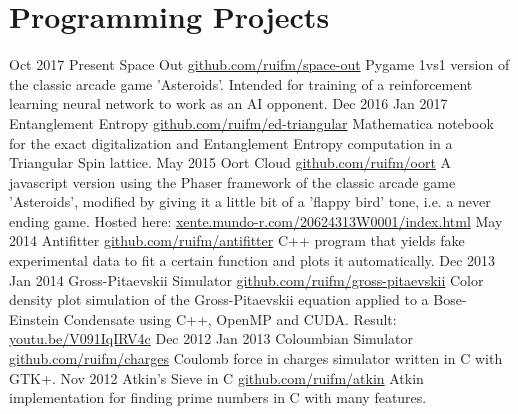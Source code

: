 \documentclass[letterpaper]{twentysecondcv} %
\begin{document}
\section{Programming Projects}

\begin{twenty} %
    \twentyitem
        {Oct 2017}
        {Present}
        {Space Out}
        {\href{https://github.com/ruifm/space-out}{\faGithub github.com/ruifm/space-out}}
        {}
        {Pygame 1vs1 version of the classic arcade game 'Asteroids'. Intended for training of a reinforcement learning neural network to work as an AI opponent.}
    \twentyitem
        {Dec 2016}
        {Jan 2017}
        {Entanglement Entropy}
        {\href{https://github.com/ruifm/ed-triangular}{\faGithub github.com/ruifm/ed-triangular}}
        {}
        {Mathematica notebook for the exact digitalization and Entanglement Entropy computation in a Triangular Spin lattice.}
    \twentyitem
        {May 2015}
        {}
        {Oort Cloud}
        {\href{https://github.com/ruifm/oort}{\faGithub github.com/ruifm/oort}}
        {}
        {A javascript version using the Phaser framework of the classic arcade game 'Asteroids', modified by giving it a little bit of a 'flappy bird' tone, i.e. a never ending game. Hosted here: \href{www.xente.mundo-r.com/20624313W0001/index.html}{xente.mundo-r.com/20624313W0001/index.html}}
    \twentyitem
        {May 2014}
        {}
        {Antifitter}
        {\href{https://github.com/ruifm/antifitter}{\faGithub github.com/ruifm/antifitter}}
        {}
        {C++ program that yields fake experimental data to fit a certain function and plots it automatically.}
     \twentyitem
        {Dec 2013}
        {Jan 2014}
        {Gross-Pitaevskii Simulator}
        {\href{https://github.com/ruifm/gross-pitaevskii}{\faGithub github.com/ruifm/gross-pitaevskii}}
        {}
        {Color density plot simulation of the Gross-Pitaevskii equation applied to a Bose-Einstein Condensate using C++, OpenMP and CUDA. Result: \href{https://youtu.be/V091IqIRV4c}{youtu.be/V091IqIRV4c}}
    \twentyitem
        {Dec 2012}
        {Jan 2013}
        {Coloumbian Simulator}
        {\href{https://github.com/ruifm/charges}{\faGithub github.com/ruifm/charges}}
        {}
        {Coulomb force in charges simulator written in C with GTK+.}
    \twentyitem
        {Nov 2012}
        {}
        {Atkin's Sieve in C}
        {\href{https://github.com/ruifm/atkin}{\faGithub github.com/ruifm/atkin}}
        {}
        {Atkin implementation for finding prime numbers in C with many features.}       
\end{twenty}
\end{document}
